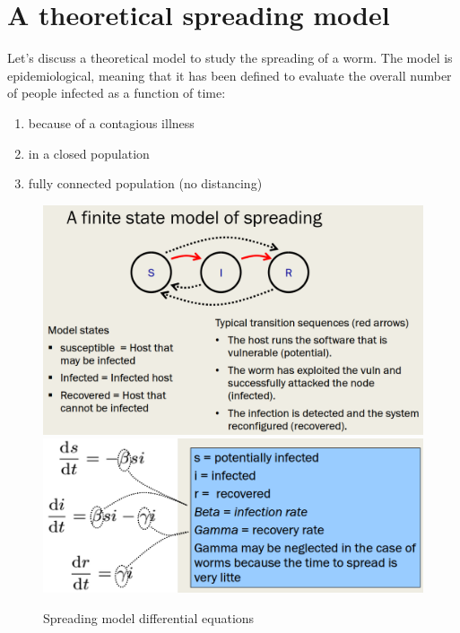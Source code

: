 \section{A theoretical spreading model}
Let's discuss a theoretical model to study the spreading of a
worm.
The model is epidemiological, meaning that it has been defined to evaluate the overall number of people infected as a function of time:

\begin{enumerate}
   \item because of a contagious illness
   \item in a closed population
   \item fully connected population (no distancing)
\end{enumerate}

\begin{figure}[htbp]
   \centering
   \includegraphics[width=0.45\columnwidth]{images/spreadingmodel.png}
   \includegraphics[width=0.45\columnwidth]{images/spreadingmodel_equations.png}
   \caption{Spreading model differential equations}
   \label{fig:spreadingmodel}
\end{figure}


